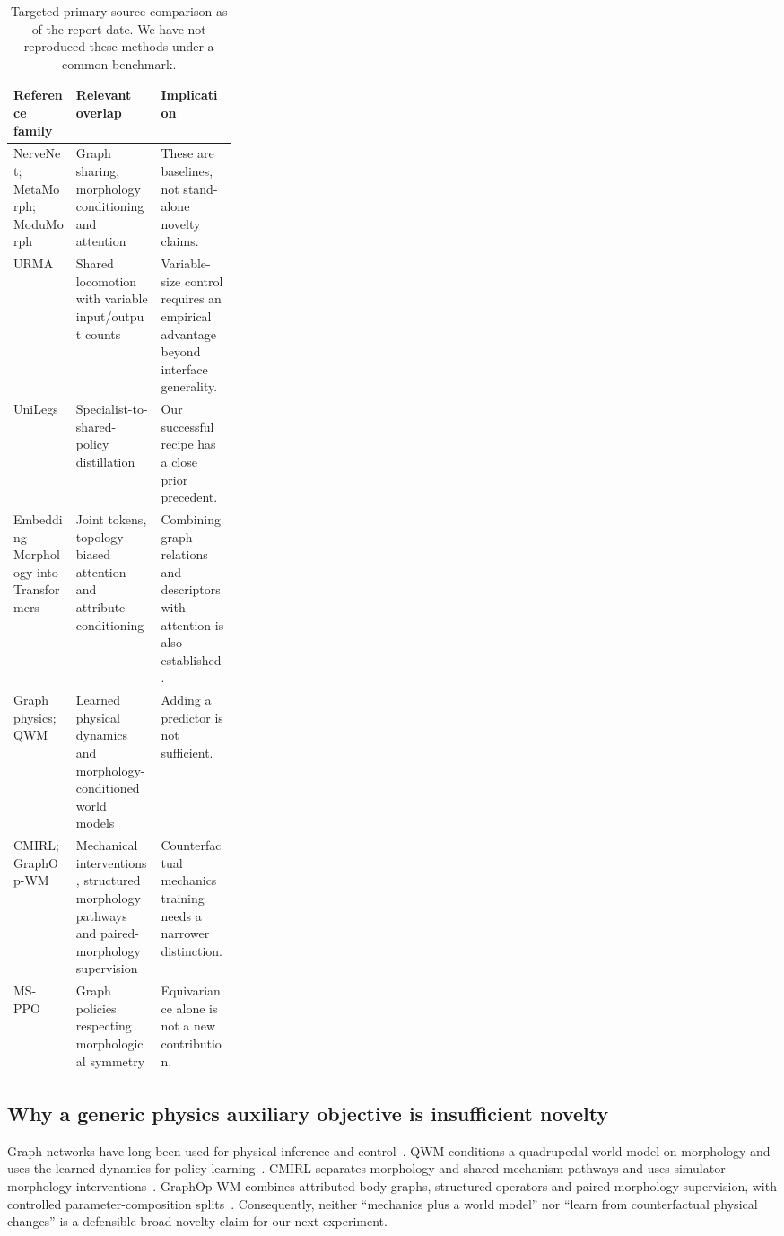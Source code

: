 \documentclass[11pt,letterpaper]{article}
\begin{document}
\begin{table}[htbp]
\centering\small
\begin{tabularx}{\linewidth}{@{}p{0.29\linewidth}YY@{}}
\toprule
Reference family & Relevant overlap & Implication\\
\midrule
NerveNet; MetaMorph; ModuMorph & Graph sharing, morphology conditioning and
attention & These are baselines, not stand-alone novelty claims.\\
URMA & Shared locomotion with variable input/output counts & Variable-size control
requires an empirical advantage beyond interface generality.\\
UniLegs & Specialist-to-shared-policy distillation & Our successful recipe has a
close prior precedent.\\
Embedding Morphology into Transformers~\cite{embedding} & Joint tokens,
topology-biased attention and attribute conditioning & Combining graph relations
and descriptors with attention is also established.\\
Graph physics; QWM~\cite{graphphysics,qwm} & Learned physical dynamics and
morphology-conditioned world models & Adding a predictor is not sufficient.\\
CMIRL; GraphOp-WM~\cite{cmirl,graphop} & Mechanical interventions, structured
morphology pathways and paired-morphology supervision & Counterfactual mechanics
training needs a narrower distinction.\\
MS-PPO~\cite{symmetry} & Graph policies respecting morphological symmetry &
Equivariance alone is not a new contribution.\\
\bottomrule
\end{tabularx}
\caption{Targeted primary-source comparison as of the report date. We have not
reproduced these methods under a common benchmark.}
\end{table}

\subsection{Why a generic physics auxiliary objective is insufficient novelty}
Graph networks have long been used for physical inference and
control~\cite{graphphysics}. QWM conditions a quadrupedal world model on morphology
and uses the learned dynamics for policy learning~\cite{qwm}. CMIRL separates
morphology and shared-mechanism pathways and uses simulator morphology
interventions~\cite{cmirl}. GraphOp-WM combines attributed body graphs, structured
operators and paired-morphology supervision, with controlled parameter-composition
splits~\cite{graphop}. Consequently, neither ``mechanics plus a world model'' nor
``learn from counterfactual physical changes'' is a defensible broad novelty
claim for our next experiment.
\end{document}
